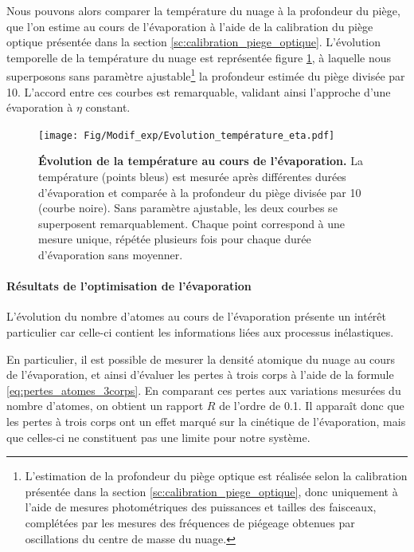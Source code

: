 Nous pouvons alors comparer la température du nuage à la profondeur du piège, que l'on estime au cours de l'évaporation à l'aide de la calibration du piège optique présentée dans la section \ref{sc:calibration_piege_optique}. L'évolution temporelle de la température du nuage est représentée figure \ref{fig:eta_constant}, à laquelle nous superposons sans paramètre ajustable\footnote{L'estimation de la profondeur du piège optique est réalisée selon la calibration présentée dans la section \ref{sc:calibration_piege_optique}, donc uniquement à l'aide de mesures photométriques des puissances et tailles des faisceaux, complétées par les mesures des fréquences de piégeage obtenues par oscillations du centre de masse du nuage.} la profondeur estimée du piège divisée par 10. L'accord entre ces courbes est remarquable, validant ainsi l'approche d'une évaporation à $\eta$ constant.

\begin{figure}
\centering
\texttt{[image: Fig/Modif\_exp/Evolution\_température\_eta.pdf]}
\caption{\textbf{Évolution de la température au cours de l'évaporation.} La température (points bleus) est mesurée après différentes durées d'évaporation et comparée à la profondeur du piège divisée par 10 (courbe noire). Sans paramètre ajustable, les deux courbes se superposent remarquablement. Chaque point correspond à une mesure unique, répétée plusieurs fois pour chaque durée d'évaporation sans moyenner.}
\label{fig:eta_constant}
\end{figure}






\paragraph*{Résultats de l'optimisation de l'évaporation}
L'évolution du nombre d'atomes au cours de l'évaporation présente un intérêt particulier car celle-ci contient les informations liées aux processus inélastiques.

En particulier, il est possible de mesurer la densité atomique du nuage au cours de l'évaporation, et ainsi d'évaluer les pertes à trois corps à l'aide de la formule \ref{eq:pertes_atomes_3corps}. En comparant ces pertes aux variations mesurées du nombre d'atomes, on obtient un rapport $R$ de l'ordre de 0.1. Il apparaît donc que les pertes à trois corps ont un effet marqué sur la cinétique de l'évaporation, mais que celles-ci ne constituent pas une limite pour notre système. 


